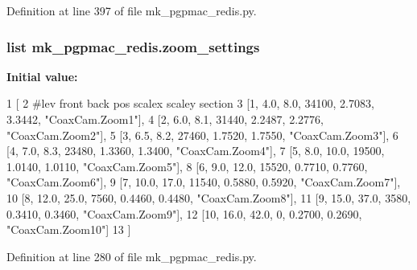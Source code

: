Definition at line 397 of file mk\-\_\-pgpmac\-\_\-redis.\-py.

\hypertarget{namespacemk__pgpmac__redis_ad91bac9be746f99e1cf1f8e28ff348be}{
\subsubsection[{zoom\-\_\-settings}]{\setlength{\rightskip}{0pt plus 5cm}list mk\-\_\-pgpmac\-\_\-redis.\-zoom\-\_\-settings}}\label{namespacemk__pgpmac__redis_ad91bac9be746f99e1cf1f8e28ff348be}
{\bfseries Initial value\-:}
\begin{DoxyCode}
1 [
2     \textcolor{comment}{#lev   front  back  pos     scalex  scaley   section}
3     [1,     4.0,   8.0,  34100, 2.7083,  3.3442, \textcolor{stringliteral}{"CoaxCam.Zoom1"}],
4     [2,     6.0,   8.1,  31440, 2.2487,  2.2776, \textcolor{stringliteral}{"CoaxCam.Zoom2"}],
5     [3,     6.5,   8.2,  27460, 1.7520,  1.7550, \textcolor{stringliteral}{"CoaxCam.Zoom3"}],
6     [4,     7.0,   8.3,  23480, 1.3360,  1.3400, \textcolor{stringliteral}{"CoaxCam.Zoom4"}],
7     [5,     8.0,  10.0,  19500, 1.0140,  1.0110, \textcolor{stringliteral}{"CoaxCam.Zoom5"}],
8     [6,     9.0,  12.0,  15520, 0.7710,  0.7760, \textcolor{stringliteral}{"CoaxCam.Zoom6"}],
9     [7,    10.0,  17.0,  11540, 0.5880,  0.5920, \textcolor{stringliteral}{"CoaxCam.Zoom7"}],
10     [8,    12.0,  25.0,   7560, 0.4460,  0.4480, \textcolor{stringliteral}{"CoaxCam.Zoom8"}],
11     [9,    15.0,  37.0,   3580, 0.3410,  0.3460, \textcolor{stringliteral}{"CoaxCam.Zoom9"}],
12     [10,   16.0,  42.0,      0, 0.2700,  0.2690, \textcolor{stringliteral}{"CoaxCam.Zoom10"}]
13     ]
\end{DoxyCode}


Definition at line 280 of file mk\-\_\-pgpmac\-\_\-redis.\-py.

